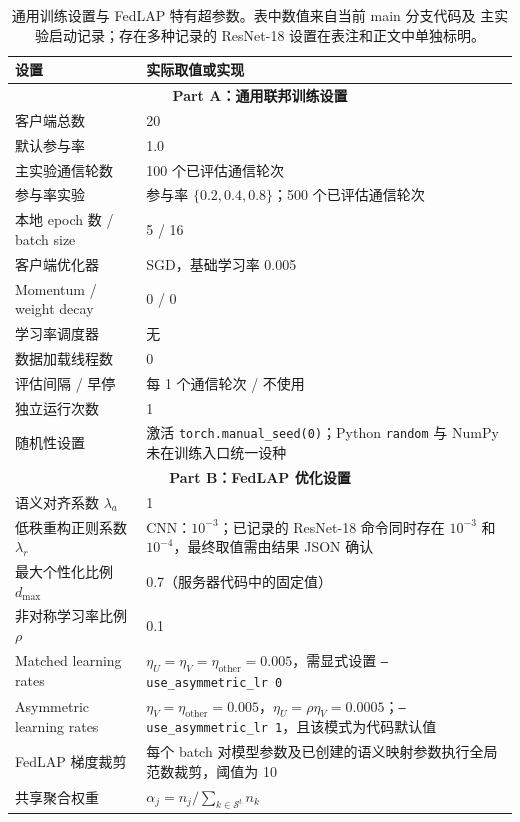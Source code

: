 \begin{table}[t]
\centering
\caption{通用训练设置与 FedLAP 特有超参数。表中数值来自当前 main 分支代码及
主实验启动记录；存在多种记录的 ResNet-18 设置在表注和正文中单独标明。}
\label{tab:appendix_implementation_settings}
\small
\setlength{\tabcolsep}{5pt}
\renewcommand{\arraystretch}{1.12}
\begin{tabularx}{\textwidth}{@{}p{4.8cm}X@{}}
\toprule
\textbf{设置} & \textbf{实际取值或实现} \\
\midrule
\multicolumn{2}{c}{\textbf{Part A：通用联邦训练设置}} \\
\midrule
客户端总数 & 20 \\
默认参与率 & 1.0 \\
主实验通信轮数 & 100 个已评估通信轮次 \\
参与率实验 & 参与率 $\{0.2,0.4,0.8\}$；500 个已评估通信轮次 \\
本地 epoch 数 / batch size & 5 / 16 \\
客户端优化器 & SGD，基础学习率 0.005 \\
Momentum / weight decay & 0 / 0 \\
学习率调度器 & 无 \\
数据加载线程数 & 0 \\
评估间隔 / 早停 & 每 1 个通信轮次 / 不使用 \\
独立运行次数 & 1 \\
随机性设置 & 激活 \texttt{torch.manual\_seed(0)}；Python \texttt{random} 与 NumPy 未在训练入口统一设种 \\
\midrule
\multicolumn{2}{c}{\textbf{Part B：FedLAP 优化设置}} \\
\midrule
语义对齐系数 $\lambda_a$ & 1 \\
低秩重构正则系数 $\lambda_r$ & CNN：$10^{-3}$；已记录的 ResNet-18 命令同时存在 $10^{-3}$ 和 $10^{-4}$，最终取值需由结果 JSON 确认 \\
最大个性化比例 $d_{\max}$ & 0.7（服务器代码中的固定值） \\
非对称学习率比例 $\rho$ & 0.1 \\
Matched learning rates & $\eta_U=\eta_V=\eta_{\mathrm{other}}=0.005$，需显式设置 \texttt{--use\_asymmetric\_lr 0} \\
Asymmetric learning rates & $\eta_V=\eta_{\mathrm{other}}=0.005$，$\eta_U=\rho\eta_V=0.0005$；\texttt{--use\_asymmetric\_lr 1}，且该模式为代码默认值 \\
FedLAP 梯度裁剪 & 每个 batch 对模型参数及已创建的语义映射参数执行全局范数裁剪，阈值为 10 \\
共享聚合权重 & $\alpha_j=n_j/\sum_{k\in\mathcal S^t}n_k$ \\

\end{tabularx}
\end{table}

